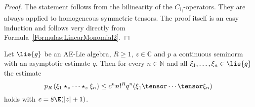 \begin{proof}
	The statement follows from the bilinearity of the $C_{i_j}$-operators. They 
	are always applied to homogeneous symmetric tensors. The proof itself is an 
	easy induction and follows very directly from
	Formula~\eqref{Formulas:LinearMonomial2}.
\end{proof}
\begin{lemma}
    \label{LCAna:Lemma:LemmaPreContinuityN}%
    Let $\lie{g}$ be an AE-Lie algebra, $R \geq 1$, $z \in \mathbb{C}$ and $p$ 
    a continuous seminorm with an asymptotic estimate $q$. Then for every $n 
    \in \mathbb{N}$ and all $\xi_1, \ldots, \xi_n \in \lie{g}$ the estimate
    \begin{equation}
        \label{LCAna:LemmaPreContinuityN}
        p_R \left(
            \xi_1 \star_z \cdots \star_z \xi_n
        \right)
        \leq
        c^n n!^R
        q^n(\xi_1 \tensor \cdots \tensor \xi_n)
    \end{equation}
    holds with $c = 8 \E (|z| + 1)$.
\end{lemma}
